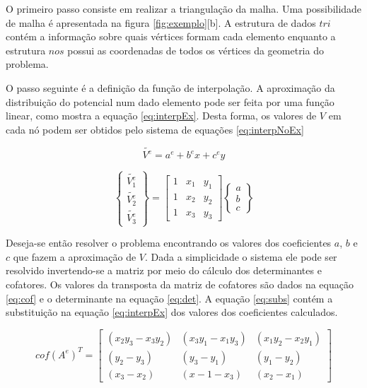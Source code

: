 \documentclass[
    12pt,               %
    openright,          %
    oneside,
    a4paper,            %
    english,            %
    french,             %
    spanish,            %
    brazil              %
    ]{abntex2}
\begin{document}
\begin{apendicesenv}
O primeiro passo consiste em realizar a triangulação da malha. Uma possibilidade de malha é apresentada na figura \ref{fig:exemplo}[b]. A estrutura de dados $tri$ contém a informação sobre quais vértices formam cada elemento enquanto a estrutura $nos$ possui as coordenadas de todos os vértices da geometria do problema. 

O passo seguinte é a definição da função de interpolação. A aproximação da distribuição do potencial num dado elemento pode ser feita por uma função linear, como mostra a equação \ref{eq:interpEx}. Desta forma, os valores de $V$ em cada nó podem ser obtidos pelo sistema de equações \ref{eq:interpNoEx}

\begin{equation}
\label{eq:interpEx}
\tilde{V^e} = a^e + b^e x + c^e y
\end{equation}

\begin{equation}
\label{eq:interpNoEx}
\begin{Bmatrix}
\tilde{V^e_1}  \\
\tilde{V^e_2} \\
\tilde{V^e_3}
\end{Bmatrix}
=
\begin{bmatrix}
1 & x_1 & y_1 \\
1 & x_2 & y_2 \\
1 & x_3 & y_3
\end{bmatrix}
\begin{Bmatrix}
a \\
b \\
c
\end{Bmatrix}
\end{equation}

Deseja-se então resolver o problema encontrando os valores dos coeficientes $a$, $b$ e $c$ que fazem a aproximação de $V$. Dada a simplicidade o sistema ele pode ser resolvido invertendo-se a matriz por meio do cálculo dos determinantes e cofatores. Os valores da transposta da matriz de cofatores são dados na equação \ref{eq:cof} e o determinante na equação \ref{eq:det}. A equação \ref{eq:subs} contém a substituição na equação \ref{eq:interpEx} dos valores dos coeficientes calculados.

\begin{equation}
\label{eq:cof}
cof(A^e)^T
=
\begin{bmatrix}
(x_2y_3 - x_3y_2) & (x_3y_1 - x_1y_3) & (x_1y_2 - x_2y_1) \\
(y_2 - y_3) & (y_3 - y_1) & (y_1 - y_2) \\
(x_3 - x_2) & (x-1 - x_3) & (x_2 - x_1)
\end{bmatrix}
\end{equation}


\end{apendicesenv}
\end{document}
